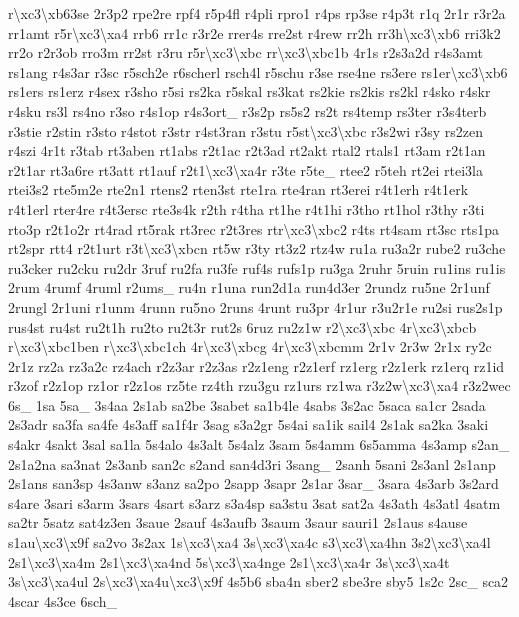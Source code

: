 \begin{DoxyCompactItemize}
r\textbackslash{}xc3\textbackslash{}xb63se 2r3p2 rpe2re rpf4 r5p4fl r4pli rpro1 r4ps rp3se r4p3t r1q 2r1r r3r2a rr1amt r5r\textbackslash{}xc3\textbackslash{}xa4 rrb6 rr1c r3r2e rrer4s rre2st r4rew rr2h rr3h\textbackslash{}xc3\textbackslash{}xb6 rri3k2 rr2o r2r3ob rro3m rr2st r3ru r5r\textbackslash{}xc3\textbackslash{}xbc rr\textbackslash{}xc3\textbackslash{}xbc1b 4r1s r2s3a2d r4s3amt rs1ang r4s3ar r3sc r5sch2e r6scherl rsch4l r5schu r3se rse4ne rs3ere rs1er\textbackslash{}xc3\textbackslash{}xb6 rs1ers rs1erz r4sex r3sho r5si rs2ka r5skal rs3kat rs2kie rs2kis rs2kl r4sko r4skr r4sku rs3l rs4no r3so r4s1op r4s3ort\-\_\- r3s2p rs5s2 rs2t rs4temp rs3ter r3s4terb r3stie r2stin r3sto r4stot r3str r4st3ran r3stu r5st\textbackslash{}xc3\textbackslash{}xbc r3s2wi r3sy rs2zen r4szi 4r1t r3tab rt3aben rt1abs r2t1ac r2t3ad rt2akt rtal2 rtals1 rt3am r2t1an r2t1ar rt3a6re rt3att rt1auf r2t1\textbackslash{}xc3\textbackslash{}xa4r r3te r5te\-\_\- rtee2 r5teh rt2ei rtei3la rtei3s2 rte5m2e rte2n1 rtens2 rten3st rte1ra rte4ran rt3erei r4t1erh r4t1erk r4t1erl rter4re r4t3ersc rte3s4k r2th r4tha rt1he r4t1hi r3tho rt1hol r3thy r3ti rto3p r2t1o2r rt4rad rt5rak rt3rec r2t3res rtr\textbackslash{}xc3\textbackslash{}xbc2 r4ts rt4sam rt3sc rts1pa rt2spr rtt4 r2t1urt r3t\textbackslash{}xc3\textbackslash{}xbcn rt5w r3ty rt3z2 rtz4w ru1a ru3a2r rube2 ru3che ru3cker ru2cku ru2dr 3ruf ru2fa ru3fe ruf4s rufs1p ru3ga 2ruhr 5ruin ru1ins ru1is 2rum 4rumf 4ruml r2ums\-\_\- ru4n r1una run2d1a run4d3er 2rundz ru5ne 2r1unf 2rungl 2r1uni r1unm 4runn ru5no 2runs 4runt ru3pr 4r1ur r3u2r1e ru2si rus2s1p rus4st ru4st ru2t1h ru2to ru2t3r rut2s 6ruz ru2z1w r2\textbackslash{}xc3\textbackslash{}xbc 4r\textbackslash{}xc3\textbackslash{}xbcb r\textbackslash{}xc3\textbackslash{}xbc1ben r\textbackslash{}xc3\textbackslash{}xbc1ch 4r\textbackslash{}xc3\textbackslash{}xbcg 4r\textbackslash{}xc3\textbackslash{}xbcmm 2r1v 2r3w 2r1x ry2c 2r1z rz2a rz3a2c rz4ach r2z3ar r2z3as r2z1eng r2z1erf rz1erg r2z1erk rz1erq rz1id r3zof r2z1op rz1or r2z1os rz5te rz4th rzu3gu rz1urs rz1wa r3z2w\textbackslash{}xc3\textbackslash{}xa4 r3z2wec 6s\-\_\- 1sa 5sa\-\_\- 3s4aa 2s1ab sa2be 3sabet sa1b4le 4sabs 3s2ac 5saca sa1cr 2sada 2s3adr sa3fa sa4fe 4s3aff sa1f4r 3sag s3a2gr 5s4ai sa1ik sail4 2s1ak sa2ka 3saki s4akr 4sakt 3sal sa1la 5s4alo 4s3alt 5s4alz 3sam 5s4amm 6s5amma 4s3amp s2an\-\_\- 2s1a2na sa3nat 2s3anb san2c s2and san4d3ri 3sang\-\_\- 2sanh 5sani 2s3anl 2s1anp 2s1ans san3sp 4s3anw s3anz sa2po 2sapp 3sapr 2s1ar 3sar\-\_\- 3sara 4s3arb 3s2ard s4are 3sari s3arm 3sars 4sart s3arz s3a4sp sa3stu 3sat sat2a 4s3ath 4s3atl 4satm sa2tr 5satz sat4z3en 3saue 2sauf 4s3aufb 3saum 3saur sauri1 2s1aus s4ause s1au\textbackslash{}xc3\textbackslash{}x9f sa2vo 3s2ax 1s\textbackslash{}xc3\textbackslash{}xa4 3s\textbackslash{}xc3\textbackslash{}xa4c s3\textbackslash{}xc3\textbackslash{}xa4hn 3s2\textbackslash{}xc3\textbackslash{}xa4l 2s1\textbackslash{}xc3\textbackslash{}xa4m 2s1\textbackslash{}xc3\textbackslash{}xa4nd 5s\textbackslash{}xc3\textbackslash{}xa4nge 2s1\textbackslash{}xc3\textbackslash{}xa4r 3s\textbackslash{}xc3\textbackslash{}xa4t 3s\textbackslash{}xc3\textbackslash{}xa4ul 2s\textbackslash{}xc3\textbackslash{}xa4u\textbackslash{}xc3\textbackslash{}x9f 4s5b6 sba4n sber2 sbe3re sby5 1s2c 2sc\-\_\- sca2 4scar 4s3ce 6sch\-\_\- 
\end{DoxyCompactItemize}
